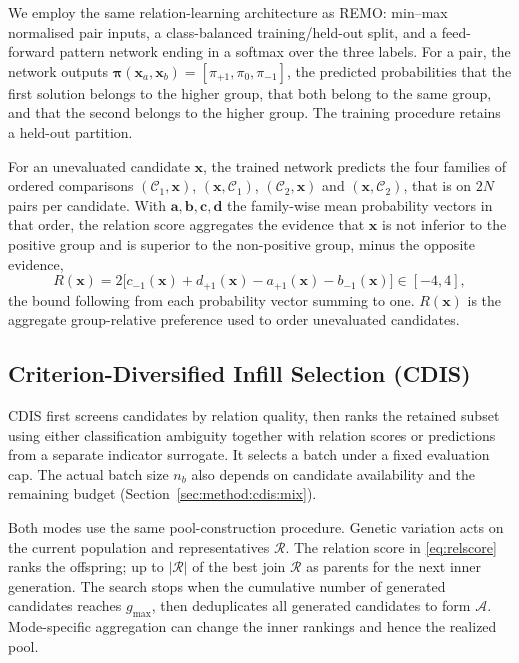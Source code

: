\documentclass[final,5p,times,twocolumn]{elsarticle}
\newcommand{\vx}{\mathbf{x}}
\begin{document}
We employ the same relation-learning architecture as REMO: min--max normalised
pair inputs, a class-balanced training/held-out split, and a feed-forward pattern
network ending in a softmax over the three labels.
For a pair, the network outputs
$\bm{\pi}(\vx_a,\vx_b)=[\pi_{+1},\pi_0,\pi_{-1}]$, the predicted probabilities
that the first solution belongs to the higher group, that both belong to the
same group, and that the second belongs to the higher group. The training procedure retains a held-out partition.

For an unevaluated candidate $\vx$, the trained network predicts the four
families of ordered comparisons $(\mathcal{C}_1,\vx)$, $(\vx,\mathcal{C}_1)$,
$(\mathcal{C}_2,\vx)$ and $(\vx,\mathcal{C}_2)$, that is on $2N$ pairs per
candidate. With $\mathbf{a},\mathbf{b},\mathbf{c},\mathbf{d}$ the family-wise
mean probability vectors in that order, the relation score aggregates the
evidence that $\vx$ is not inferior to the positive group and is superior to the
non-positive group, minus the opposite evidence,
\begin{equation}
R(\vx)=2\bigl[c_{-1}(\vx)+d_{+1}(\vx)-a_{+1}(\vx)-b_{-1}(\vx)\bigr]
\in[-4,4],
\label{eq:relscore}
\end{equation}
the bound following from each probability vector summing to one. $R(\vx)$ is the
aggregate group-relative preference used to order unevaluated candidates.

\subsection{Criterion-Diversified Infill Selection (CDIS)}
\label{sec:method:cdis}

CDIS first screens candidates by relation quality, then ranks the retained
subset using either classification ambiguity together with relation scores or
predictions from a separate indicator surrogate. It selects a batch under a
fixed evaluation cap. The actual batch size $n_b$ also depends on candidate
availability and the remaining budget (Section~\ref{sec:method:cdis:mix}).

Both modes use the same pool-construction procedure. Genetic
variation acts on the current population and representatives $\mathcal{R}$.
The relation score in \eqref{eq:relscore} ranks the offspring; up to
$|\mathcal{R}|$ of the best join $\mathcal{R}$ as parents for the next inner
generation. The search stops when the cumulative number of generated candidates
reaches $g_{\max}$, then deduplicates all generated candidates to form
$\mathcal{A}$. Mode-specific aggregation can change the inner rankings and
hence the realized pool.
\end{document}
